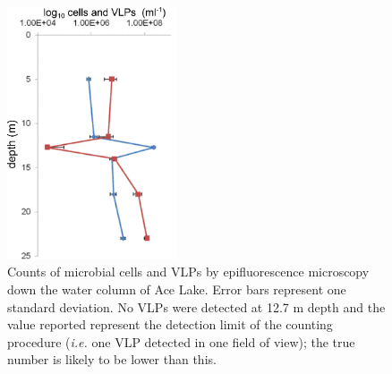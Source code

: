 \begin{figure}
\centering
\includegraphics[width=50mm]{ace_figures/ace_counts.pdf}
\caption[Counts of microbial cells and \acp{VLP} in Ace Lake]{Counts of microbial cells and \acp{VLP} by epifluorescence microscopy down the water column of Ace Lake.
Error bars represent one standard deviation.
No \acp{VLP} were detected at 12.7 m depth and the value reported represent the detection limit of the counting procedure (\emph{i.e.} one \ac{VLP} detected in one field of view); the true number is likely to be lower than this.
}
\label{fig:ace_counts}

\end{figure}

